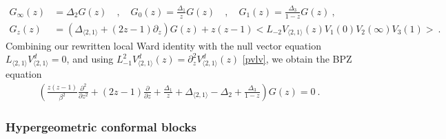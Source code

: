 \documentclass[12pt, a4paper]{article}
\theoremstyle{break}
\begin{document}
\begin{align}
 G_\infty(z) &= \Delta_2 G(z) \quad , \quad G_0(z) = \frac{\Delta_1}{z}G(z)\quad , \quad G_1(z) = \frac{\Delta_3}{1-z}G(z)\ ,
 \\
 G_z(z) &= \left(\Delta_{\langle 2,1\rangle} + (2z-1)\partial_z\right) G(z) + z(z-1)\Big<L_{-2}V_{\langle 2,1\rangle}(z)V_{1}(0)V_{2}(\infty)V_{3}(1)\Big>
 \ .
\end{align}
Combining our rewritten local Ward identity with the null vector equation $L_{\langle 2,1\rangle}V^d_{\langle 2,1\rangle}=0$, and using $L_{-1}^2 V^d_{\langle 2,1\rangle}(z) = \partial_z^2 V^d_{\langle 2,1\rangle}(z)$ \eqref{pvlv}, we obtain the BPZ equation 
\begin{align}
 \left(\frac{z(z-1)}{\beta^2}\frac{\partial^2}{\partial z^2} + (2z-1)\frac{\partial}{\partial z} + \frac{\Delta_1}{z} + \Delta_{\langle 2,1\rangle}-\Delta_2  +\frac{\Delta_3}{1-z} \right) G(z) = 0 \ .
\end{align}

\subsubsection{Hypergeometric conformal blocks}
\end{document}
